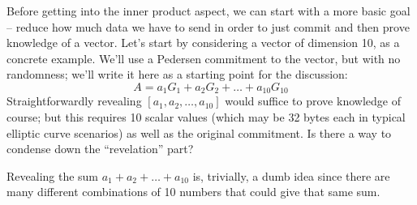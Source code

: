 \documentclass[10pt,a4paper]{article}
\begin{document}
Before getting into the inner product aspect, we can start with a more
basic goal -- reduce how much data we have to send in order to just
commit and then prove knowledge of a vector. Let's start by considering
a vector of dimension 10, as a concrete example. We'll use a Pedersen
commitment to the vector,\emph{ }but with no randomness; we'll write it
here as a starting point for the discussion:
\[A = a_1 G_1 + a_2 G_2 + \ldots + a_{10} G_{10}\]
Straightforwardly revealing $[a_{1}, a_{2}, \ldots , a_{10}]$ would suffice to prove knowledge of course;
but this requires 10 scalar values (which may be 32 bytes each in
typical elliptic curve scenarios) as well as the original commitment. Is
there a way to condense down the ``revelation'' part?

Revealing the sum $a_1 + a_2 + \ldots + a_{10}$ is, trivially, a dumb idea since there are many
different combinations of 10 numbers that could give that same sum.
\end{document}

